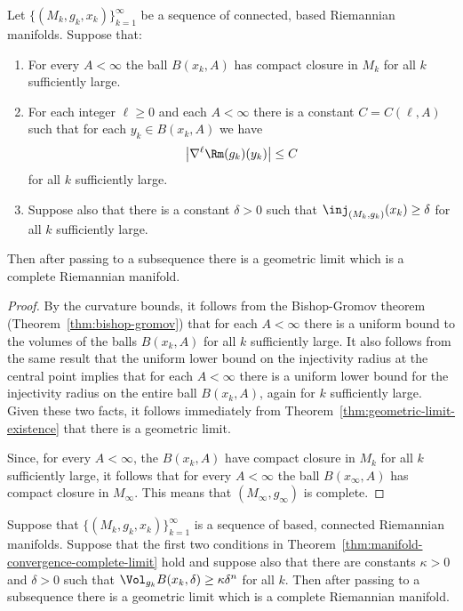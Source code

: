 \begin{theorem}\label{thm:manifold-convergence-complete-limit}
\notready
\label{mfdconv}

Let $\{(M_k,g_k,x_k)\}_{k=1}^\infty$ be a sequence  of connected,
based Riemannian manifolds. Suppose that:
\begin{enumerate}
\item[(1)] For every $A<\infty$ the ball
$B(x_k,A)$ has compact closure in $M_k$ for all $k$ sufficiently
large.
\item[(2)] For each integer $\ell\ge 0$ and each $A<\infty$ there is a constant
$C=C(\ell,A)$ such that for each $y_k\in B(x_k,A)$ we have
$$\left|\nabla^\ell\Rm(g_k)(y_k)\right|\le C$$
for all $k$ sufficiently large.
\item[(3)] Suppose also that there is a constant $\delta>0$ such that $\inj_{(M_k,g_k)}(x_k)\ge \delta$ for all $k$ sufficiently large.
\end{enumerate}
 Then after passing to a subsequence there is a geometric limit which
 is a complete Riemannian manifold.
\end{theorem}

\begin{proof}
\sketch
{}
By the curvature bounds, it follows from the Bishop-Gromov theorem
(Theorem~\ref{thm:bishop-gromov}) that for each $A<\infty$ there is a uniform bound
to the volumes of the balls $B(x_k,A)$ for all $k$ sufficiently large. It also
follows from the same result that  the uniform lower bound on the injectivity
radius at the central point implies that for each $A<\infty$ there is a uniform
lower bound for the injectivity radius on the entire ball $B(x_k,A)$, again for
$k$ sufficiently large. Given these two facts, it follows immediately from
Theorem~\ref{thm:geometric-limit-existence} that there is a geometric limit.

Since, for every $A<\infty$, the $B(x_k,A)$ have compact closure in
$M_k$ for all $k$ sufficiently large, it follows that for every
$A<\infty$ the ball $B(x_\infty,A)$ has compact closure in
$M_\infty$. This means that $(M_\infty,g_\infty)$ is complete.
\end{proof}

\begin{corollary}\label{cor:manifold-convergence-volume-noncollapsed}
\notready
\label{2ndmfdconv}

Suppose that $\{(M_k,g_k,x_k)\}_{k=1}^\infty$ is a sequence of based, connected
Riemannian manifolds. Suppose that the first two conditions in
Theorem~\ref{thm:manifold-convergence-complete-limit} hold and suppose also that there are constants $\kappa>0$
and $\delta>0$ such that $\Vol_{g_k}B(x_k,\delta)\ge \kappa\delta^n$ for
all $k$. Then after passing to a subsequence there is a geometric limit which
is a complete Riemannian manifold.
\end{corollary}

